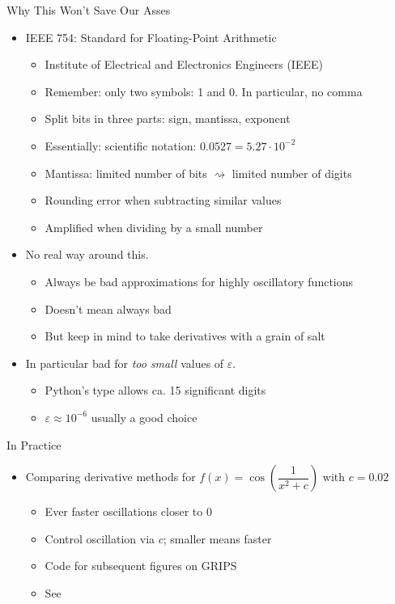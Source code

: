 \begin{frame}{Why This Won't Save Our Asses}
%
\begin{itemize}
\item IEEE 754: Standard for Floating-Point Arithmetic
	\begin{itemize}
	\item Institute of Electrical and Electronics Engineers (IEEE)
	\item Remember: only two symbols: 1 and 0. In particular, no comma
	\item Split bits in three parts: sign, mantissa, exponent
	\item Essentially: scientific notation: $0.0527 = 5.27 \cdot 10^{-2}$
	\item Mantissa: limited number of bits $\rightsquigarrow$ limited number of digits
	\item Rounding error when subtracting similar values
	\item Amplified when dividing by a small number
	\end{itemize}
\item No real way around this.
	\begin{itemize}
	\item Always be bad approximations for highly oscillatory functions
	\item Doesn't mean always bad
	\item But keep in mind to take derivatives with a grain of salt
	\end{itemize}
\item In particular bad for \emph{too small} values of $\varepsilon$.
	\begin{itemize}
	\item Python's  type allows ca. 15 significant digits
	\item $\varepsilon \approx 10^{-6}$ usually a good choice
	\end{itemize}
\end{itemize}
%
\end{frame}


\begin{frame}[fragile]{In Practice}
%
\begin{itemize}
\item Comparing derivative methods for $f(x) = \cos(\dfrac{1}{x^2 + c})$ with $c = 0.02$
	\begin{itemize}
	\item Ever faster oscillations closer to 0
	\item Control oscillation via $c$; smaller means faster
	\item Code for subsequent figures on GRIPS
	\item See 
	\end{itemize}
\end{itemize}
%
\end{frame}

